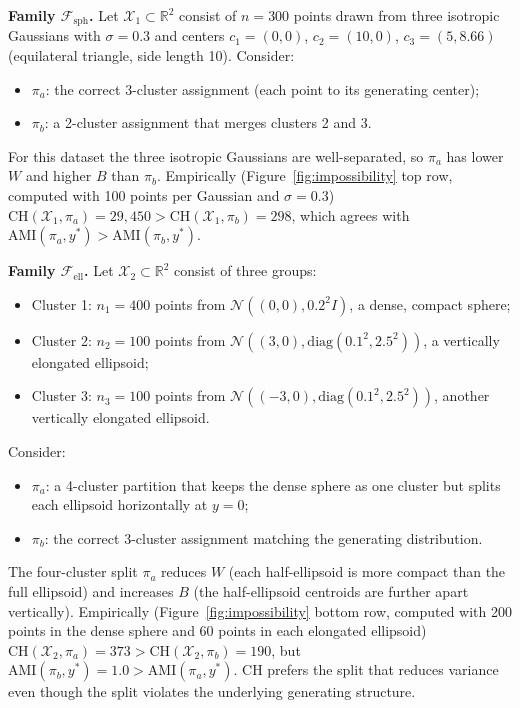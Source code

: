 \documentclass[10pt]{article} %
\begin{document}
\textbf{Family $\mathcal{F}_{\text{sph}}$.} Let $\mathcal{X}_1 \subset \mathbb{R}^2$ consist of $n = 300$ points drawn from three isotropic Gaussians with $\sigma = 0.3$ and centers $c_1 = (0, 0)$, $c_2 = (10, 0)$, $c_3 = (5, 8.66)$ (equilateral triangle, side length 10). Consider:
\begin{itemize}
    \item $\pi_a$: the correct 3-cluster assignment (each point to its generating center);
    \item $\pi_b$: a 2-cluster assignment that merges clusters 2 and 3.
\end{itemize}
For this dataset the three isotropic Gaussians are well-separated, so $\pi_a$ has lower $W$ and higher $B$ than $\pi_b$. Empirically (Figure~\ref{fig:impossibility} top row, computed with 100 points per Gaussian and $\sigma = 0.3$) $\text{CH}(\mathcal{X}_1, \pi_a) = 29{,}450 > \text{CH}(\mathcal{X}_1, \pi_b) = 298$, which agrees with $\text{AMI}(\pi_a, y^*) > \text{AMI}(\pi_b, y^*)$.

\textbf{Family $\mathcal{F}_{\text{ell}}$.} Let $\mathcal{X}_2 \subset \mathbb{R}^2$ consist of three groups:
\begin{itemize}
    \item Cluster 1: $n_1 = 400$ points from $\mathcal{N}((0,0), 0.2^2 I)$, a dense, compact sphere;
    \item Cluster 2: $n_2 = 100$ points from $\mathcal{N}((3,0), \text{diag}(0.1^2, 2.5^2))$, a vertically elongated ellipsoid;
    \item Cluster 3: $n_3 = 100$ points from $\mathcal{N}((-3,0), \text{diag}(0.1^2, 2.5^2))$, another vertically elongated ellipsoid.
\end{itemize}
Consider:
\begin{itemize}
    \item $\pi_a$: a 4-cluster partition that keeps the dense sphere as one cluster but splits each ellipsoid horizontally at $y=0$;
    \item $\pi_b$: the correct 3-cluster assignment matching the generating distribution.
\end{itemize}
The four-cluster split $\pi_a$ reduces $W$ (each half-ellipsoid is more compact than the full ellipsoid) and increases $B$ (the half-ellipsoid centroids are further apart vertically). Empirically (Figure~\ref{fig:impossibility} bottom row, computed with 200 points in the dense sphere and 60 points in each elongated ellipsoid) $\text{CH}(\mathcal{X}_2, \pi_a) = 373 > \text{CH}(\mathcal{X}_2, \pi_b) = 190$, but $\text{AMI}(\pi_b, y^*) = 1.0 > \text{AMI}(\pi_a, y^*)$. CH prefers the split that reduces variance even though the split violates the underlying generating structure.
\end{document}
